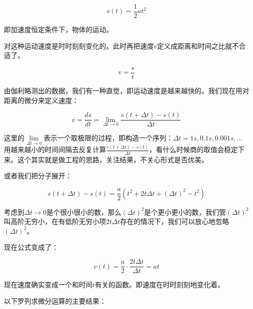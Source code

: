 \begin{equation}
s(t) = \frac{1}{2} a t^2
\end{equation}

即加速度恒定条件下，物体的运动。

对这种运动速度是时时刻刻变化的。此时再把速度$v$定义成距离和时间之比就不合适了。

\begin{equation}
v = \frac{s}{t}
\end{equation}

由伽利略测出的数据，我们有一种直觉，即运动速度是越来越快的。我们现在用对距离的微分来定义速度：

\begin{equation}
v = \frac{d s}{d t } = \lim\limits_{\Delta t \to 0} \frac{s(t + \Delta t) - s(t)}{\Delta t}
\end{equation}

这里的$\lim\limits_{\Delta t \to 0}$表示一个取极限的过程，即构造一个序列：$\Delta t = 1 s, 0.1 s, 0.001s , ...$用越来越小的时间间隔去反复计算$\frac{s(t + \Delta t) - s(t)}{\Delta t}$，看什么时候商的取值会稳定下来。这个其实就是做工程的思路，关注结果，不关心形式是否优美。

或者我们把分子展开：

\begin{equation*}
s(t + \Delta t) - s(t) = \frac{a}{2} \left( t^2 + 2t \Delta t + (\Delta t)^2 - t^2 \right)
\end{equation*}

考虑到$ \Delta t \to 0 $是个很小很小的数，那么$( \Delta t )^2$是个更小更小的数，我们管$(\Delta t) ^2$叫高阶无穷小，在有低阶无穷小项$2 t \Delta t$存在的情况下，我们可以放心地忽略$( \Delta t )^2$。


现在公式变成了：

\begin{equation*}
v(t) = \frac{a}{2}  \cdot  \frac{2t \Delta t}{\Delta t } = at
\end{equation*}

现在速度确实变成一个和时间$t$有关的函数。即速度在时时刻刻地变化着。

以下罗列求微分运算的主要结果：

